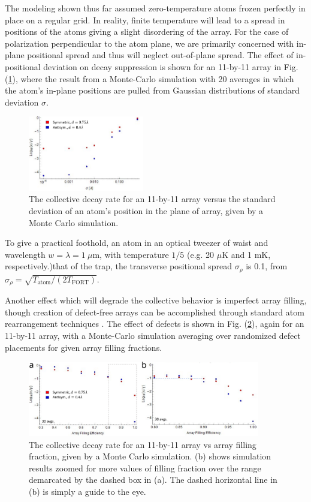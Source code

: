 The modeling shown thus far assumed zero-temperature atoms frozen perfectly in place on a regular grid. In reality, finite temperature will lead to a spread in positions of the atoms giving a slight disordering of the array. For the case of polarization perpendicular to the atom plane, we are primarily concerned with in-plane positional spread and thus will neglect out-of-plane spread. The effect of in-positional deviation on decay suppression is shown for an 11-by-11 array in Fig. (\ref{fig:superradiance_vs_atomspread}), where the result from a Monte-Carlo simulation with 20 averages in which the atom's in-plane positions are pulled from Gaussian distributions of standard deviation $\sigma$.
\begin{figure}[!ht]
    \centering
    \includegraphics[width=0.45\textwidth]{Images/superradiance_vs_atom_spread.pdf}
    \caption{The collective decay rate for an 11-by-11 array versus the standard deviation of an atom's position in the plane of array, given by a Monte Carlo simulation.}
    \label{fig:superradiance_vs_atomspread}
\end{figure}
To give a practical foothold, an atom in an optical tweezer of waist and wavelength $w=\lambda=1~\mu$m, with temperature $1/5$ (e.g. 20 $\mu$K and 1 mK, respectively.)that of the trap, the transverse positional spread $\sigma_{\rho}$ is 0.1, from $\sigma_{\rho} = \sqrt{T_{\textrm{atom}}/(2T_{\textrm{FORT}})}$.
 
Another effect which will degrade the collective behavior is imperfect array filling, though creation of defect-free arrays can be accomplished through standard atom rearrangement techniques \cite{Ebadi2021}. The effect of defects is shown in Fig. (\ref{fig:superradiance_vs_eff}), again for an 11-by-11 array, with a Monte-Carlo simulation averaging over randomized defect placements for given array filling fractions.
\begin{figure}[!ht]
    \centering
    \includegraphics[width=0.9\textwidth]{Images/superradiance_vs_array_efficiency.pdf}
    \caption{The collective decay rate for an 11-by-11 array vs array filling fraction, given by a Monte Carlo simulation. (b) shows simulation results zoomed for more values of filling fraction over the range demarcated by the dashed box in (a). The dashed horizontal line in (b) is simply a guide to the eye.}
    \label{fig:superradiance_vs_eff}
\end{figure}

